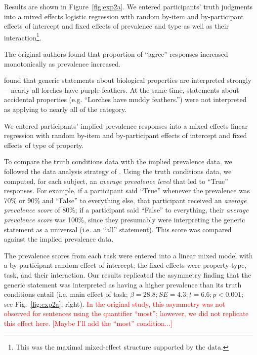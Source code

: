 \documentclass[10pt,letterpaper]{article}
\newcommand{\red}[1]{\textcolor{Red}{#1}}
\begin{document}
Results are shown in Figure~\ref{fig:exp2a}. We entered participants' truth judgments into a mixed effects logistic regression with random by-item and by-participant effects of intercept and fixed effects of prevalence and type as well as their interaction\footnote{This was the maximal mixed-effect structure supported by the data.}.  

The original authors found that proportion of ``agree'' responses increased monotonically as prevalence increased. 

%


\citeauthor{Cimpian2010} found that generic statements about biological properties are interpreted strongly---nearly all lorches have purple feathers.
At the same time, statements about accidental properties (e.g. ``Lorches have muddy feathers.'') were not interpreted as applying to nearly all of the category.

We entered participants' implied prevalence responses into a mixed effects linear regression with random by-item and by-participant effects of intercept and fixed effects of type of property.

To compare the truth conditions data with the implied prevalence data, we followed the data analysis strategy of \citeauthor{Cimpian2010}. Using the truth conditions data, we computed, for each subject, an \emph{average prevalence level} that led to ``True'' responses. For example, if a participant said ``True'' whenever the prevalence was 70\% or 90\% and ``False'' to everything else, that participant received an \emph{average prevalence score} of 80\%; if a participant said ``False'' to everything, their \emph{average prevalence score} was 100\%, since they presumably were interpreting the generic statement as a universal (i.e. an ``all'' statement). This score was compared against the implied prevalence data.

The prevalence scores from each task were entered into a linear mixed model with a by-participant random effect of intercept; the fixed effects were property-type, task, and their interaction. Our results replicated the asymmetry finding that the generic statement was interpreted as having a higher prevalence than its truth conditions entail (i.e. main effect of task; $\beta=28.8; SE = 4.3; t=6.6; p < 0.001$; see Fig.~\ref{fig:exp2a}, right). \red{In the original study, this asymmetry was not observed for sentences using the quantifier ``most''; however, we did not replicate this effect here. [Maybe I'll add the ``most'' condition...]}
\end{document}

